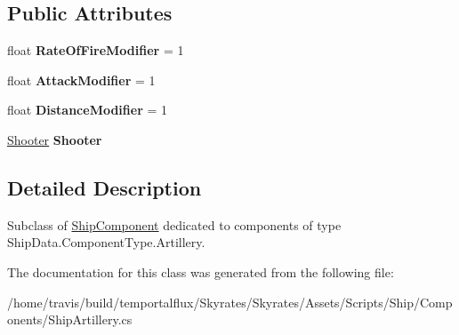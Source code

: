 \subsection*{Public Attributes}
\begin{DoxyCompactItemize}
\item 
\hypertarget{class_skyrates_1_1_ship_1_1_ship_artillery_ac2d79f50eaff4608d5d087f31cd174ad}{float {\bfseries Rate\-Of\-Fire\-Modifier} = 1}\label{class_skyrates_1_1_ship_1_1_ship_artillery_ac2d79f50eaff4608d5d087f31cd174ad}

\item 
\hypertarget{class_skyrates_1_1_ship_1_1_ship_artillery_a301c1be383de2793706f5b22f90b803a}{float {\bfseries Attack\-Modifier} = 1}\label{class_skyrates_1_1_ship_1_1_ship_artillery_a301c1be383de2793706f5b22f90b803a}

\item 
\hypertarget{class_skyrates_1_1_ship_1_1_ship_artillery_abdfa7faa8878b383aa9ff49cf78df7e7}{float {\bfseries Distance\-Modifier} = 1}\label{class_skyrates_1_1_ship_1_1_ship_artillery_abdfa7faa8878b383aa9ff49cf78df7e7}

\item 
\hypertarget{class_skyrates_1_1_ship_1_1_ship_artillery_ae1cc615bfe49b8eeb089c2b36d7417f7}{\hyperlink{class_skyrates_1_1_mono_1_1_shooter}{Shooter} {\bfseries Shooter}}\label{class_skyrates_1_1_ship_1_1_ship_artillery_ae1cc615bfe49b8eeb089c2b36d7417f7}

\end{DoxyCompactItemize}


\subsection{Detailed Description}
Subclass of \hyperlink{class_skyrates_1_1_ship_1_1_ship_component}{Ship\-Component} dedicated to components of type Ship\-Data.\-Component\-Type.\-Artillery. 



The documentation for this class was generated from the following file\-:\begin{DoxyCompactItemize}
\item 
/home/travis/build/temportalflux/\-Skyrates/\-Skyrates/\-Assets/\-Scripts/\-Ship/\-Components/Ship\-Artillery.\-cs\end{DoxyCompactItemize}
